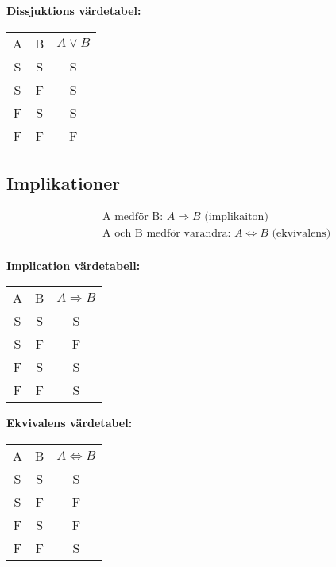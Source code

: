 \textbf{Dissjuktions värdetabel:}\par
\begin{center}
\begin{tabular}{ |c|c|c| } 
 \hline
 A  & B  & \(A \lor B\) \\ 
 S  & S  & S          \\ 
 S  & F  & S          \\  
 F  & S  & S          \\ 
 F  & F  & F          \\ 
 \hline
\end{tabular}
\end{center}



\subsection{Implikationer}
\begin{align*}
  &\quad \text{A medför B: } A \Rightarrow B \text{ (implikaiton)} \\
  &\quad \text{A och B medför varandra: } A \Leftrightarrow B \text{ (ekvivalens)} \\
\end{align*}

\newpage
\textbf{Implication värdetabell:}\par
\begin{center}
\begin{tabular}{ |c|c|c| } 
 \hline
 A  & B  & \(A \Rightarrow B\) \\ 
 S  & S  & S          \\ 
 S  & F  & F          \\  
 F  & S  & S          \\ 
 F  & F  & S          \\ 
 \hline
\end{tabular}
\end{center}

\textbf{Ekvivalens värdetabel:}\par
\begin{center}
\begin{tabular}{ |c|c|c| } 
 \hline
 A  & B  & \(A \Leftrightarrow B\) \\ 
 S  & S  & S          \\ 
 S  & F  & F          \\  
 F  & S  & F          \\ 
 F  & F  & S          \\ 
 \hline
\end{tabular}
\end{center}


